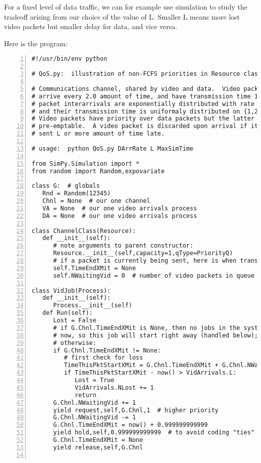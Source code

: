 \documentclass[11pt]{article}
\begin{document}
For a fixed level of data traffic, we can for example use simulation to
study the tradeoff arising from our choice of the value of L.  Smaller L
means more lost video packets but smaller delay for data, and vice
versa.

Here is the program:

\begin{Verbatim}[fontsize=\relsize{-2},numbers=left]
#!/usr/bin/env python

# QoS.py:  illustration of non-FCFS priorities in Resource class

# Communications channel, shared by video and data.  Video packets
# arrive every 2.0 amount of time, and have transmission time 1.0.  Data
# packet interarrivals are exponentially distributed with rate DArrRate,
# and their transmission time is uniformaly distributed on {1,2,3,4,5}.
# Video packets have priority over data packets but the latter are not
# pre-emptable.  A video packet is discarded upon arrival if it would be
# sent L or more amount of time late.

# usage:  python QoS.py DArrRate L MaxSimTime

from SimPy.Simulation import *
from random import Random,expovariate

class G:  # globals
   Rnd = Random(12345)
   Chnl = None  # our one channel
   VA = None  # our one video arrivals process
   DA = None  # our one video arrivals process

class ChannelClass(Resource):
   def __init__(self):  
      # note arguments to parent constructor:
      Resource.__init__(self,capacity=1,qType=PriorityQ)
      # if a packet is currently being sent, here is when transmit will end
      self.TimeEndXMit = None
      self.NWaitingVid = 0  # number of video packets in queue

class VidJob(Process):
   def __init__(self):
      Process.__init__(self)  
   def Run(self):
      Lost = False
      # if G.Chnl.TimeEndXMit is None, then no jobs in the system
      # now, so this job will start right away (handled below); 
      # otherwise:
      if G.Chnl.TimeEndXMit != None:  
         # first check for loss
         TimeThisPktStartXMit = G.Chnl.TimeEndXMit + G.Chnl.NWaitingVid
         if TimeThisPktStartXMit - now() > VidArrivals.L:
            Lost = True
            VidArrivals.NLost += 1
            return
      G.Chnl.NWaitingVid += 1
      yield request,self,G.Chnl,1  # higher priority
      G.Chnl.NWaitingVid -= 1
      G.Chnl.TimeEndXMit = now() + 0.999999999999
      yield hold,self,0.999999999999  # to avoid coding "ties"
      G.Chnl.TimeEndXMit = None
      yield release,self,G.Chnl


\end{Verbatim}
\end{document}
